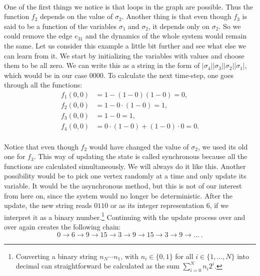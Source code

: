 \paragraph*{}
One of the first things we notice is that loops in the graph are possible. Thus the function $f_2$ depends on the value of $\sigma_2$. Another thing is that even though $f_3$ is said to be a function of the variables $\sigma_1$ and $\sigma_2$, it depends only on $\sigma_2$.  So we could remove the edge $e_{31}$ and the dynamics of the whole system would remain the same. Let us consider this example a little bit further and see what else we can learn from it. We start by initializing the variables with values and choose them to be all zero. We can write this as a string in the form of $|\sigma_4||\sigma_3||\sigma_2||\sigma_1|$, which would be in our case $0000$. To calculate the next time-step, one goes through all the functions:
\begin{align}
f_1(0,0) & = 1-(1-0)(1-0) = 0,\\
f_2(0,0) & = 1-0\cdot(1-0) = 1,\\
f_3(0,0) & = 1 - 0 = 1,\\
f_4(0,0) & = 0\cdot(1-0)+(1-0)\cdot 0 = 0.
\end{align}

\paragraph*{}
Notice that even though $f_2$ would have changed the value of $\sigma_2$, we used its old one for $f_3$. This way of updating the state is called synchronous because all the functions are calculated simultaneously. We will always do it like this. Another possibility would be to pick one vertex randomly at a time and only update its variable. It would be the asynchronous method, but this is not of our interest from here on, since the system would no longer be deterministic.
After the update, the new string reads $0110$ or as its integer representation $6$, if we interpret it as a binary number.\footnote{Converting a binary string $n_N\cdots n_1$, with $n_i\in\{0,1\}$ for all $i\in\{1,\dots,N\}$ into decimal can straightforward be calculated as the sum $\sum\limits_{i = 0}^N n_i 2^i$.} Continuing with the update process over and over again creates the following chain:
\begin{equation}\label{eq:cycle3}
0 \rightarrow 6 \rightarrow 9 \rightarrow 15 \rightarrow 3 \rightarrow 9 \rightarrow 15 \rightarrow 3 \rightarrow 9 \rightarrow \dots\ .
\end{equation}

